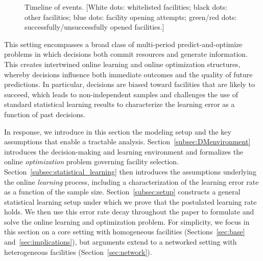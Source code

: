 \documentclass[blindrev]{informs3noheader}
\begin{document}
\begin{figure}[h!]
    \caption{Timeline of events. [White dots: whitelisted facilities; black dots: other facilities; blue dots: facility opening attempts; green/red dots: successfully/unsuccessfully opened facilities.]}
    \label{fig:timeline}
    \vspace{-12pt}
\end{figure}

This setting encompasses a broad class of multi-period predict-and-optimize problems in which decisions both commit resources and generate information. This creates intertwined online learning and online optimization structures, whereby decisions influence both immediate outcomes and the quality of future predictions. In particular, decisions are biased toward facilities that are likely to succeed, which leads to non-independent samples and challenges the use of standard statistical learning results to characterize the learning error as a function of past decisions.

In response, we introduce in this section the modeling setup and the key assumptions that enable a tractable analysis. Section~\ref{subsec:DMenvironment} introduces the decision-making and learning environment and formalizes the online \emph{optimization} problem governing facility selection. Section~\ref{subsec:statistical_learning} then introduces the assumptions underlying the online \emph{learning} process, including a characterization of the learning error rate as a function of the sample size. Section~\ref{subsec:setup} constructs a general statistical learning setup under which we prove that the postulated learning rate holds. We then use this error rate decay throughout the paper to formulate and solve the online learning and optimization problem. For simplicity, we focus in this section on a core setting with homogeneous facilities (Sections~\ref{sec:base} and~\ref{sec:implications}), but arguments extend to a networked setting with heterogeneous facilities (Section~\ref{sec:network}).
\end{document}
